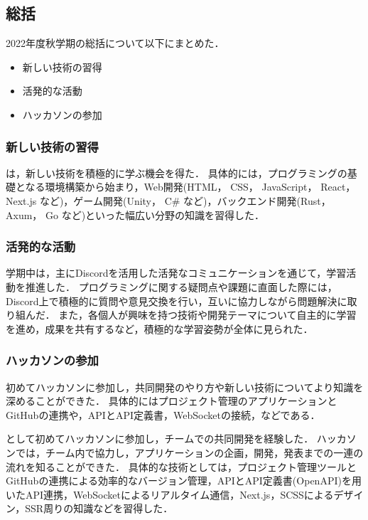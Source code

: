\subsection*{\firstGrade{}総括}


2022年度秋学期の\firstGrade{}総括について以下にまとめた．

\begin{itemize}
	\item 新しい技術の習得
	\item 活発的な活動
	\item ハッカソンの参加
\end{itemize}

\subsubsection*{新しい技術の習得}

\firstGrade{}は，新しい技術を積極的に学ぶ機会を得た．
具体的には，プログラミングの基礎となる環境構築から始まり，Web開発(HTML， CSS， JavaScript， React， Next.js など)，ゲーム開発(Unity， C\# など)，バックエンド開発(Rust， Axum， Go など)といった幅広い分野の知識を習得した．

\subsubsection*{活発的な活動}

学期中は，主にDiscordを活用した活発なコミュニケーションを通じて，学習活動を推進した．
プログラミングに関する疑問点や課題に直面した際には，Discord上で積極的に質問や意見交換を行い，互いに協力しながら問題解決に取り組んだ．
また，各個人が興味を持つ技術や開発テーマについて自主的に学習を進め，成果を共有するなど，積極的な学習姿勢が全体に見られた．

\subsubsection*{ハッカソンの参加}
初めてハッカソンに参加し，共同開発のやり方や新しい技術についてより知識を深めることができた．
具体的にはプロジェクト管理のアプリケーションとGitHubの連携や，APIとAPI定義書，WebSocketの接続，などである．

\firstGrade{}として初めてハッカソンに参加し，チームでの共同開発を経験した．
ハッカソンでは，チーム内で協力し，アプリケーションの企画，開発，発表までの一連の流れを知ることができた．
具体的な技術としては，プロジェクト管理ツールとGitHubの連携による効率的なバージョン管理，APIとAPI定義書(OpenAPI)を用いたAPI連携，WebSocketによるリアルタイム通信，Next.js，SCSSによるデザイン，SSR周りの知識などを習得した．
